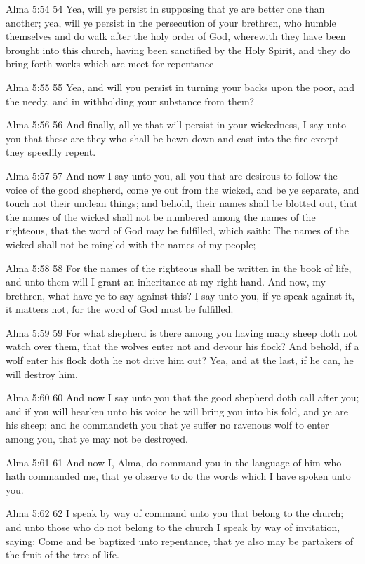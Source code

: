 Alma 5:54
 54 Yea, will ye persist in supposing that ye are better one than
another; yea, will ye persist in the persecution of your
brethren, who humble themselves and do walk after the holy order
of God, wherewith they have been brought into this church, having
been sanctified by the Holy Spirit, and they do bring forth works
which are meet for repentance--

Alma 5:55
 55 Yea, and will you persist in turning your backs upon the
poor, and the needy, and in withholding your substance from them?

Alma 5:56
 56 And finally, all ye that will persist in your wickedness, I
say unto you that these are they who shall be hewn down and cast
into the fire except they speedily repent.

Alma 5:57
 57 And now I say unto you, all you that are desirous to follow
the voice of the good shepherd, come ye out from the wicked, and
be ye separate, and touch not their unclean things; and behold,
their names shall be blotted out, that the names of the wicked
shall not be numbered among the names of the righteous, that the
word of God may be fulfilled, which saith: The names of the
wicked shall not be mingled with the names of my people;

Alma 5:58
 58 For the names of the righteous shall be written in the book
of life, and unto them will I grant an inheritance at my right
hand. And now, my brethren, what have ye to say against this? I
say unto you, if ye speak against it, it matters not, for the
word of God must be fulfilled.

Alma 5:59
 59 For what shepherd is there among you having many sheep doth
not watch over them, that the wolves enter not and devour his
flock? And behold, if a wolf enter his flock doth he not drive
him out? Yea, and at the last, if he can, he will destroy him.

Alma 5:60
 60 And now I say unto you that the good shepherd doth call after
you; and if you will hearken unto his voice he will bring you
into his fold, and ye are his sheep; and he commandeth you that
ye suffer no ravenous wolf to enter among you, that ye may not be
destroyed.

Alma 5:61
 61 And now I, Alma, do command you in the language of him who
hath commanded me, that ye observe to do the words which I have
spoken unto you.

Alma 5:62
 62 I speak by way of command unto you that belong to the church;
and unto those who do not belong to the church I speak by way of
invitation, saying: Come and be baptized unto repentance, that ye
also may be partakers of the fruit of the tree of life.

